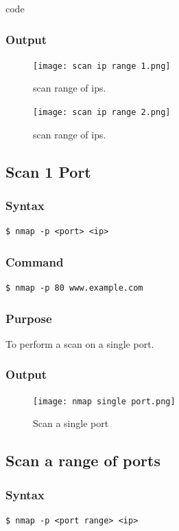 code \documentclass[11pt]{article}
\begin{document}
\subsubsection*{Output}
\begin{figure}[H]
    \centering
    \texttt{[image: scan ip range 1.png]}
    \caption{scan range of ips. }
    \label{fig:1}
\end{figure}
\begin{figure}[H]
    \centering
    \texttt{[image: scan ip range 2.png]}
    \caption{scan range of ips. }
    \label{fig:1}
\end{figure}

\subsection{Scan 1 Port}

\subsubsection{Syntax}
\begin{verbatim}
$ nmap -p <port> <ip>
\end{verbatim}

\subsubsection*{Command}
\begin{verbatim}
$ nmap -p 80 www.example.com
\end{verbatim}

\subsubsection*{Purpose}
To perform a scan on a single port.

\subsubsection*{Output}
\begin{figure}[H]
    \centering
    \texttt{[image: nmap single port.png]}
    \caption{Scan a single port}
    \label{fig:1}
\end{figure}

\subsection{Scan a range of ports}

\subsubsection{Syntax}
\begin{verbatim}
$ nmap -p <port range> <ip>
\end{verbatim}
\end{document}
